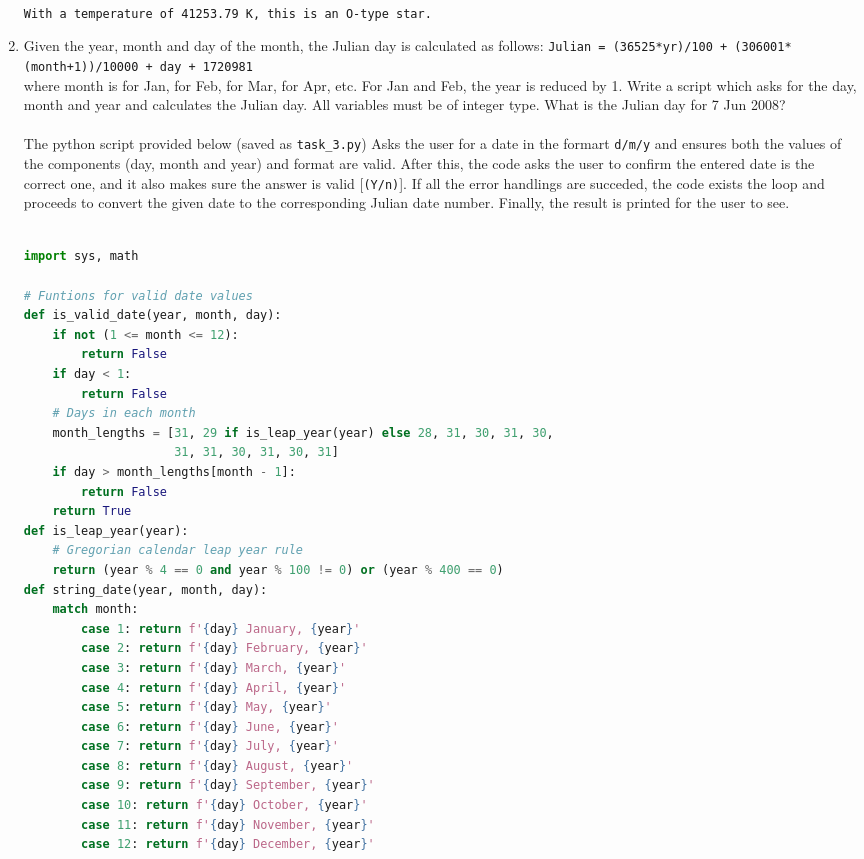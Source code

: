 \documentclass[a4paper,12pt]{article}
\DeclareRobustCommand{\regular}{\fontseries{m}\selectfont}
\DeclareRobustCommand{\bold}{\fontseries{b}\selectfont}
\newcommand{\rcode}[1]{\texttt{\fontsize{11}{13}\selectfont#1}}
\newcommand{\bcode}[1]{\texttt{\fontsize{11}{13}\selectfont\bold#1}}
\newenvironment{solution}{}{}
\begin{document}
\begin{enumerate}
\begin{solution}
  \\\rcode{With a temperature of 41253.79 K, this is an O-type star.}\vspace{1.5mm}
  \end{solution}
  \item Given the year, month and day of the month, the Julian day is
  calculated as follows: \bcode{Julian = (36525*yr)/100 + (306001*(month+1))/10000
   + day + 1720981}\\where month is \bcode{13} for Jan, \bcode{14} for Feb,
   \bcode{3} for Mar, \bcode{4} for Apr, etc. For Jan and Feb, the year is reduced
   by 1. Write a script which asks for the day, month and year and calculates the
   Julian day. All variables must be of integer type. What is the Julian day for 7 Jun 2008?
  \begin{solution}
    \\\\\regular The python script provided below (saved as \bcode{task\_3.py})
    Asks the user for a date in the formart \bcode{d/m/y} and ensures both the
    values of the components (day, month and year) and format are valid. After
    this, the code asks the user to confirm the entered date is the correct one,
    and it also makes sure the answer is valid [\bcode{(Y/n)}]. If all the error
    handlings are succeded, the code exists the loop and proceeds to convert the
    given date to the corresponding Julian date number. Finally, the result is
    printed for the user to see.\\\\
    \begin{lstlisting}[language=python]
import sys, math

# Funtions for valid date values
def is_valid_date(year, month, day):
    if not (1 <= month <= 12):
        return False
    if day < 1:
        return False
    # Days in each month
    month_lengths = [31, 29 if is_leap_year(year) else 28, 31, 30, 31, 30,
                     31, 31, 30, 31, 30, 31]
    if day > month_lengths[month - 1]:
        return False
    return True
def is_leap_year(year):
    # Gregorian calendar leap year rule
    return (year % 4 == 0 and year % 100 != 0) or (year % 400 == 0)
def string_date(year, month, day):
    match month:
        case 1: return f'{day} January, {year}'
        case 2: return f'{day} February, {year}'
        case 3: return f'{day} March, {year}'
        case 4: return f'{day} April, {year}'
        case 5: return f'{day} May, {year}'
        case 6: return f'{day} June, {year}'
        case 7: return f'{day} July, {year}'
        case 8: return f'{day} August, {year}'
        case 9: return f'{day} September, {year}'
        case 10: return f'{day} October, {year}'
        case 11: return f'{day} November, {year}'
        case 12: return f'{day} December, {year}'


\end{lstlisting}
\end{solution}
\end{enumerate}
\end{document}
